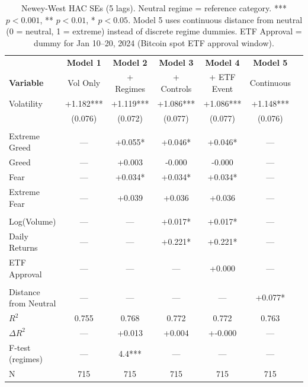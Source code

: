 \begin{table}[h!]
\centering
\caption{Progressive Model Specifications: Uncertainty Beyond Realized Volatility}
\label{tab:comprehensive_regression}
\small
\begin{tabular}{@{}lcccccc@{}}
\toprule
& \textbf{Model 1} & \textbf{Model 2} & \textbf{Model 3} & \textbf{Model 4} & \textbf{Model 5} \\
\textbf{Variable} & Vol Only & + Regimes & + Controls & + ETF Event & Continuous \\
\midrule
Volatility & +1.182*** & +1.119*** & +1.086*** & +1.086*** & +1.148*** \\
 & (0.076) & (0.072) & (0.077) & (0.077) & (0.076) \\
\addlinespace
\multicolumn{6}{l}{\textit{Regime Dummies (Neutral = baseline)}} \\
Extreme Greed & --- & +0.055* & +0.046* & +0.046* & --- \\
Greed & --- & +0.003 & -0.000 & -0.000 & --- \\
Fear & --- & +0.034* & +0.034* & +0.034* & --- \\
Extreme Fear & --- & +0.039 & +0.036 & +0.036 & --- \\
\addlinespace
\multicolumn{6}{l}{\textit{Additional Controls}} \\
Log(Volume) & --- & --- & +0.017* & +0.017* & --- \\
Daily Returns & --- & --- & +0.221* & +0.221* & --- \\
ETF Approval & --- & --- & --- & +0.000 & --- \\
\addlinespace
\multicolumn{6}{l}{\textit{Continuous Measure (Model 5)}} \\
Distance from Neutral & --- & --- & --- & --- & +0.077* \\
\midrule
$R^2$ & 0.755 & 0.768 & 0.772 & 0.772 & 0.763 \\
$\Delta R^2$ & --- & +0.013 & +0.004 & +-0.000 & --- \\
F-test (regimes) & --- & 4.4*** & --- & --- & --- \\
N & 715 & 715 & 715 & 715 & 715 \\
\bottomrule
\end{tabular}
\vspace{0.3em}
\caption*{\footnotesize Newey-West HAC SEs (5 lags). Neutral regime = reference category.
*** $p < 0.001$, ** $p < 0.01$, * $p < 0.05$.
Model 5 uses continuous distance from neutral (0 = neutral, 1 = extreme) instead of discrete regime dummies.
ETF Approval = dummy for Jan 10--20, 2024 (Bitcoin spot ETF approval window).}
\end{table}

